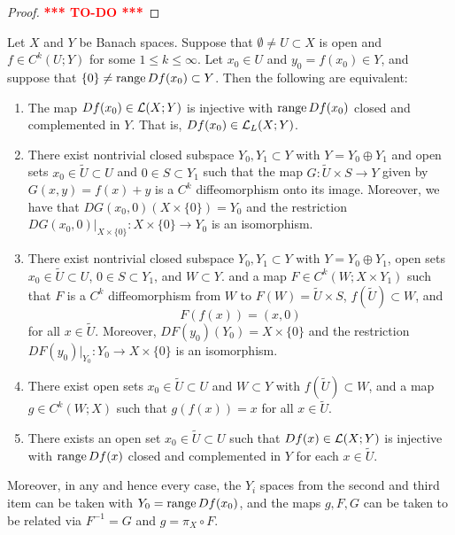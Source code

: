\documentclass[a4paper]{article}
\newcommand{\TODO}{\textcolor{red}{\textbf{*** TO-DO ***}}}
\begin{document}
\begin{proof}
\TODO
\end{proof}

\begin{thm}
Let $X$ and $Y$ be Banach spaces. Suppose that $\emptyset \neq U 
\subset X$ is open and $f \in C^k(U; Y)$ for some $1 \leq k \leq
\infty$. Let $x_0 \in U$ and $y_0 = f(x_0) \in Y$, and suppose 
that $\{0\} \neq \operatorname{range} Df(x_0) \subset Y$. Then the 
following are equivalent:
\begin{enumerate}
\item The map $Df(x_0) \in \mathcal{L}(X; Y)$ is injective with $\operatorname{range}
Df(x_0)$ closed and complemented in $Y$. That is, $Df(x_0) 
\in \mathcal{L}_L(X; Y)$. 

\item There exist nontrivial closed subspace $Y_0, Y_1 
\subset Y$ with $Y = Y_0 \oplus Y_1$ and open sets $x_0 
\in \tilde{U} \subset U$ and $0 \in S \subset Y_1$ such that 
the map $G : \tilde{U} \times S \to Y$ given by $G(x, y)
= f(x) + y$ is a $C^k$ diffeomorphism onto its image. 
Moreover, we have that $DG(x_0, 0) (X \times \{0\}) = Y_0$
and the restriction $DG(x_0, 0) \vert_{X \times \{0\}} 
: X \times \{0\} \to Y_0$ is an isomorphism.

\item There exist nontrivial closed subspace $Y_0, Y_1
\subset Y$ with $Y = Y_0 \oplus Y_1$, open sets $x_0 \in \tilde{U}
\subset U$, $0 \in S \subset Y_1$, and $W \subset Y$. 
and a map $F \in C^k(W ; X \times Y_1)$ such that $F$ 
is a $C^k$ diffeomorphism from $W$ to $F(W) = \tilde{U} 
\times S$, $f(\tilde{U}) \subset W$, and 
\[
F(f(x)) = (x, 0)
\]
for all $x \in \tilde{U}$. Moreover, $DF(y_0) (Y_0) = X \times 
\{0\}$ and the restriction $DF(y_0) \vert_{Y_0} : Y_0 
\to X \times \{0\}$ is an isomorphism.

\item There exist open sets $x_0 \in \tilde{U} \subset U$
and $W \subset Y$ with $f(\tilde{U}) \subset W$, and a map 
$g \in C^k(W ; X)$ such that $g(f(x)) = x$ for all $x \in
\tilde{U}$.

\item There exists an open set $x_0 \in \tilde{U} \subset U$
such that $Df(x) \in \mathcal{L}(X; Y)$ is injective with 
$\operatorname{range} Df(x)$ closed and complemented in $Y$ for each 
$x \in \tilde{U}$.
\end{enumerate}

Moreover, in any and hence every case, the $Y_i$ spaces 
from the second and third item can be taken with $Y_0 
= \operatorname{range} Df(x_0)$, and the maps $g, F, G$ can be taken to be related
via $F^{-1} = G$ and $g = \pi_X \circ F$.
\end{thm}
\end{document}
